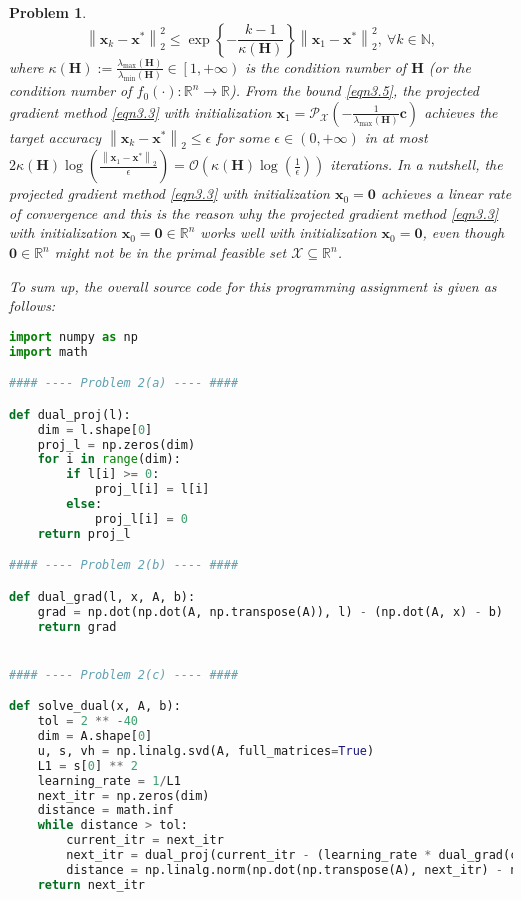 \documentclass[11pt]{article}
\newtheorem{problem}{Problem}
\begin{document}
\begin{problem}
{\begin{equation}
    \label{eqn3.5}
    \left\| \mathbf{x}_k - \mathbf{x}^* \right\|_{2}^2 \leq \exp \left\{ - \frac{k-1}{\kappa (\mathbf{H})} \right\} \left\| \mathbf{x}_1 - \mathbf{x}^* \right\|_{2}^2,\ \forall k \in \mathbb{N},
\end{equation}
where $\kappa (\mathbf{H}) := \frac{\lambda_{\max} (\mathbf{H})}{\lambda_{\min} (\mathbf{H})} \in \left[ 1, +\infty \right)$ is the \emph{condition number} of $\mathbf{H}$ (or the \emph{condition number} of $f_0(\cdot) : \mathbb{R}^n \rightarrow \mathbb{R}$). From the bound \eqref{eqn3.5}, the projected gradient method \eqref{eqn3.3} with initialization $\mathbf{x}_1 = \mathcal{P}_{\mathcal{X}} \left( - \frac{1}{\lambda_{\max} (\mathbf{H})} \mathbf{c} \right)$ achieves the target accuracy $\left\| \mathbf{x}_k - \mathbf{x}^* \right\|_2 \leq \epsilon$ for some $\epsilon \in \left( 0, +\infty \right)$ in at most $2 \kappa (\mathbf{H}) \log \left( \frac{\left\| \mathbf{x}_1 - \mathbf{x}^* \right\|_2}{\epsilon} \right) = \mathcal{O} \left( \kappa (\mathbf{H}) \log \left( \frac{1}{\epsilon} \right) \right)$ iterations. In a nutshell, the projected gradient method \eqref{eqn3.3} with initialization $\mathbf{x}_0 = \mathbf{0}$ achieves a \emph{linear rate of convergence} and this is the reason why the projected gradient method \eqref{eqn3.3} with initialization $\mathbf{x}_0 = \mathbf{0} \in \mathbb{R}^n$ works well with initialization $\mathbf{x}_0 = \mathbf{0}$, even though $\mathbf{0} \in \mathbb{R}^n$ might not be in the primal feasible set $\mathcal{X} \subseteq \mathbb{R}^n$.
\medskip

\indent To sum up, the overall source code for this programming assignment is given as follows:

\begin{lstlisting}[language = Python]
import numpy as np
import math

#### ---- Problem 2(a) ---- ####

def dual_proj(l):
    dim = l.shape[0]
    proj_l = np.zeros(dim)
    for i in range(dim):
        if l[i] >= 0:
            proj_l[i] = l[i]
        else:
            proj_l[i] = 0
    return proj_l

#### ---- Problem 2(b) ---- ####

def dual_grad(l, x, A, b):
    grad = np.dot(np.dot(A, np.transpose(A)), l) - (np.dot(A, x) - b)
    return grad


#### ---- Problem 2(c) ---- ####

def solve_dual(x, A, b):
    tol = 2 ** -40
    dim = A.shape[0]
    u, s, vh = np.linalg.svd(A, full_matrices=True)
    L1 = s[0] ** 2
    learning_rate = 1/L1
    next_itr = np.zeros(dim)
    distance = math.inf
    while distance > tol:
        current_itr = next_itr
        next_itr = dual_proj(current_itr - (learning_rate * dual_grad(current_itr, x, A, b)))
        distance = np.linalg.norm(np.dot(np.transpose(A), next_itr) - np.dot(np.transpose(A), current_itr), 2)
    return next_itr



\end{lstlisting}}
\end{problem}
\end{document}
